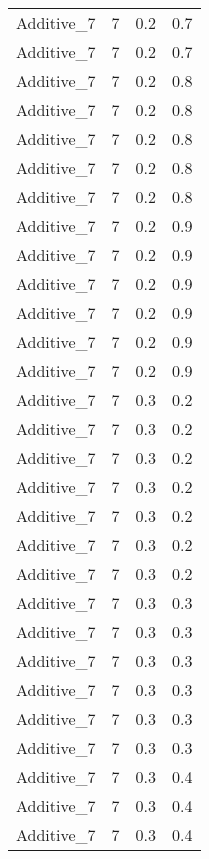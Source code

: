 \documentclass{article}
\begin{document}
\begin{longtable}[H]{lrrr}
 Additive\_7 &       7 &   0.2 &            0.7 \\
 Additive\_7 &       7 &   0.2 &            0.7 \\
 Additive\_7 &       7 &   0.2 &            0.8 \\
 Additive\_7 &       7 &   0.2 &            0.8 \\
 Additive\_7 &       7 &   0.2 &            0.8 \\
 Additive\_7 &       7 &   0.2 &            0.8 \\
 Additive\_7 &       7 &   0.2 &            0.8 \\
 Additive\_7 &       7 &   0.2 &            0.9 \\
 Additive\_7 &       7 &   0.2 &            0.9 \\
 Additive\_7 &       7 &   0.2 &            0.9 \\
 Additive\_7 &       7 &   0.2 &            0.9 \\
 Additive\_7 &       7 &   0.2 &            0.9 \\
 Additive\_7 &       7 &   0.2 &            0.9 \\
 Additive\_7 &       7 &   0.3 &            0.2 \\
 Additive\_7 &       7 &   0.3 &            0.2 \\
 Additive\_7 &       7 &   0.3 &            0.2 \\
 Additive\_7 &       7 &   0.3 &            0.2 \\
 Additive\_7 &       7 &   0.3 &            0.2 \\
 Additive\_7 &       7 &   0.3 &            0.2 \\
 Additive\_7 &       7 &   0.3 &            0.2 \\
 Additive\_7 &       7 &   0.3 &            0.3 \\
 Additive\_7 &       7 &   0.3 &            0.3 \\
 Additive\_7 &       7 &   0.3 &            0.3 \\
 Additive\_7 &       7 &   0.3 &            0.3 \\
 Additive\_7 &       7 &   0.3 &            0.3 \\
 Additive\_7 &       7 &   0.3 &            0.3 \\
 Additive\_7 &       7 &   0.3 &            0.4 \\
 Additive\_7 &       7 &   0.3 &            0.4 \\
 Additive\_7 &       7 &   0.3 &            0.4 \\

\end{longtable}
\end{document}
